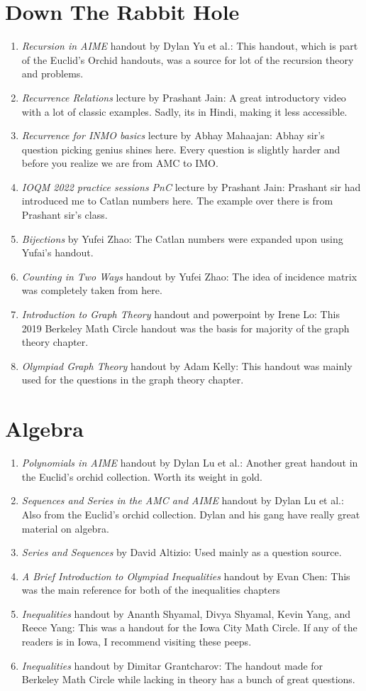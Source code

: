 \section{Down The Rabbit Hole}
\begin{enumerate}
    \item \emph{Recursion in AIME} handout by Dylan Yu et al.: This handout, which is part of the Euclid's Orchid handouts, was a source for lot of the recursion theory and problems.
    \item \emph{Recurrence Relations} lecture by Prashant Jain: A great introductory video with a lot of classic examples. Sadly, its in Hindi, making it less accessible.
    \item \emph{Recurrence for INMO basics} lecture by Abhay Mahaajan: Abhay sir's question picking genius shines here. Every question is slightly harder and before you realize we are from AMC to IMO.
    \item \emph{IOQM 2022 practice sessions PnC} lecture by Prashant Jain: Prashant sir had introduced me to Catlan numbers here. The example over there is from Prashant sir's class.
    \item \emph{Bijections} by Yufei Zhao: The Catlan numbers were expanded upon using Yufai's handout.
    \item \emph{Counting in Two Ways} handout by Yufei Zhao: The idea of incidence matrix was completely taken from here.
    \item \emph{Introduction to Graph Theory} handout and powerpoint by Irene Lo: This 2019 Berkeley Math Circle handout was the basis for majority of the graph theory chapter.
    \item \emph{Olympiad Graph Theory} handout by Adam Kelly: This handout was mainly used for the questions in the graph theory chapter.
\end{enumerate}
\section{Algebra}
\begin{enumerate}
    \item \emph{Polynomials in AIME} handout by Dylan Lu et al.: Another great handout in the Euclid's orchid collection. Worth its weight in gold.
    \item \emph{Sequences and Series in the AMC and AIME} handout by Dylan Lu et al.: Also from the Euclid's orchid collection. Dylan and his gang have really great material on algebra.
    \item \emph{Series and Sequences} by David Altizio: Used mainly as a question source.
    \item \emph{A Brief Introduction to Olympiad Inequalities} handout by Evan Chen: This was the main reference for both of the inequalities chapters
    \item \emph{Inequalities} handout by Ananth Shyamal, Divya Shyamal, Kevin Yang, and Reece Yang: This was a handout for the Iowa City Math Circle. If any of the readers is in Iowa, I recommend visiting these peeps.
    \item \emph{Inequalities} handout by Dimitar Grantcharov: The handout made for Berkeley Math Circle while lacking in theory has a bunch of great questions.
\end{enumerate}
